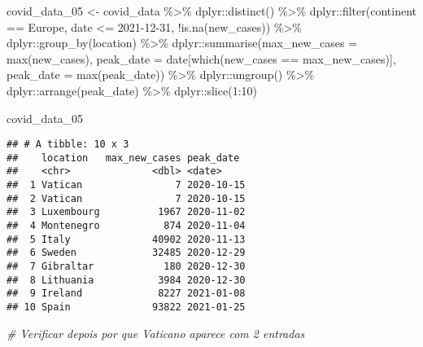 \documentclass[
]{book}
\newenvironment{Shaded}{\begin{snugshade}}{\end{snugshade}}
\newcommand{\AttributeTok}[1]{\textcolor[rgb]{0.77,0.63,0.00}{#1}}
\newcommand{\CommentTok}[1]{\textcolor[rgb]{0.56,0.35,0.01}{\textit{#1}}}
\newcommand{\DecValTok}[1]{\textcolor[rgb]{0.00,0.00,0.81}{#1}}
\newcommand{\FunctionTok}[1]{\textcolor[rgb]{0.00,0.00,0.00}{#1}}
\newcommand{\NormalTok}[1]{#1}
\newcommand{\OtherTok}[1]{\textcolor[rgb]{0.56,0.35,0.01}{#1}}
\newcommand{\SpecialCharTok}[1]{\textcolor[rgb]{0.00,0.00,0.00}{#1}}
\newcommand{\StringTok}[1]{\textcolor[rgb]{0.31,0.60,0.02}{#1}}
\begin{document}
\begin{Shaded}
\begin{Highlighting}[]
\NormalTok{covid\_data\_05 }\OtherTok{\textless{}{-}}\NormalTok{ covid\_data }\SpecialCharTok{\%\textgreater{}\%} 
\NormalTok{  dplyr}\SpecialCharTok{::}\FunctionTok{distinct}\NormalTok{() }\SpecialCharTok{\%\textgreater{}\%} 
\NormalTok{  dplyr}\SpecialCharTok{::}\FunctionTok{filter}\NormalTok{(continent }\SpecialCharTok{==} \StringTok{\textquotesingle{}Europe\textquotesingle{}}\NormalTok{,}
\NormalTok{                date }\SpecialCharTok{\textless{}=} \StringTok{\textquotesingle{}2021{-}12{-}31\textquotesingle{}}\NormalTok{,}
                \SpecialCharTok{!}\FunctionTok{is.na}\NormalTok{(new\_cases)) }\SpecialCharTok{\%\textgreater{}\%} 
\NormalTok{  dplyr}\SpecialCharTok{::}\FunctionTok{group\_by}\NormalTok{(location) }\SpecialCharTok{\%\textgreater{}\%} 
\NormalTok{  dplyr}\SpecialCharTok{::}\FunctionTok{summarise}\NormalTok{(}\AttributeTok{max\_new\_cases =} \FunctionTok{max}\NormalTok{(new\_cases),}
                   \AttributeTok{peak\_date =}\NormalTok{ date[}\FunctionTok{which}\NormalTok{(new\_cases }\SpecialCharTok{==}\NormalTok{ max\_new\_cases)],}
                   \AttributeTok{peak\_date =} \FunctionTok{max}\NormalTok{(peak\_date)) }\SpecialCharTok{\%\textgreater{}\%} 
\NormalTok{  dplyr}\SpecialCharTok{::}\FunctionTok{ungroup}\NormalTok{() }\SpecialCharTok{\%\textgreater{}\%} 
\NormalTok{  dplyr}\SpecialCharTok{::}\FunctionTok{arrange}\NormalTok{(peak\_date) }\SpecialCharTok{\%\textgreater{}\%} 
\NormalTok{  dplyr}\SpecialCharTok{::}\FunctionTok{slice}\NormalTok{(}\DecValTok{1}\SpecialCharTok{:}\DecValTok{10}\NormalTok{)}
   
\NormalTok{covid\_data\_05   }
\end{Highlighting}
\end{Shaded}

\begin{verbatim}
## # A tibble: 10 x 3
##    location   max_new_cases peak_date 
##    <chr>              <dbl> <date>    
##  1 Vatican                7 2020-10-15
##  2 Vatican                7 2020-10-15
##  3 Luxembourg          1967 2020-11-02
##  4 Montenegro           874 2020-11-04
##  5 Italy              40902 2020-11-13
##  6 Sweden             32485 2020-12-29
##  7 Gibraltar            180 2020-12-30
##  8 Lithuania           3984 2020-12-30
##  9 Ireland             8227 2021-01-08
## 10 Spain              93822 2021-01-25
\end{verbatim}

\begin{Shaded}
\begin{Highlighting}[]
\CommentTok{\# Verificar depois por que Vaticano aparece com 2 entradas}
\end{Highlighting}
\end{Shaded}
\end{document}
